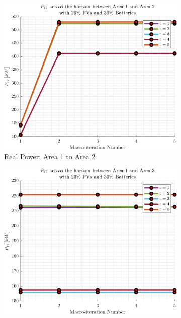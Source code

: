\documentclass[../../outputs/main.tex]{subfiles}
\begin{document}
\begin{figure}[h!]
    \centering
    \begin{subfigure}[b]{0.3\textwidth}
        \centering
        \includegraphics[width=\textwidth]{../figures/T5-pv20-batt30-genCost/dopf/convergenceCurves/BoundaryRealPower_vs_t_vs_macroItr_T_5_Areas_1_2_genCost_pv_20_batt_30_.png}
        \caption{\scriptsize Real Power: Area 1 to Area 2}
        \label{fig:real_power_1_2}
    \end{subfigure}
    \hfill
    \begin{subfigure}[b]{0.3\textwidth}
        \centering
        \includegraphics[width=\textwidth]{../figures/T5-pv20-batt30-genCost/dopf/convergenceCurves/BoundaryRealPower_vs_t_vs_macroItr_T_5_Areas_1_3_genCost_pv_20_batt_30_.png}

\end{subfigure}
\end{figure}
\end{document}
